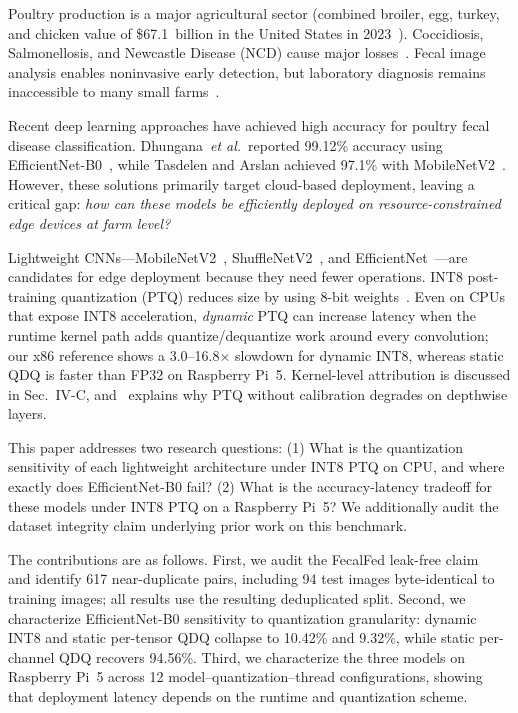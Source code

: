 \documentclass[conference,a4paper]{IEEEtran}
\begin{document}
Poultry production is a major agricultural sector (combined broiler, egg, turkey, and chicken value of \$67.1~billion in the United States in 2023~\cite{usda2024}). Coccidiosis, Salmonellosis, and Newcastle Disease (NCD) cause major losses~\cite{machuve2022}. Fecal image analysis enables noninvasive early detection, but laboratory diagnosis remains inaccessible to many small farms~\cite{tasdelen2025}.

Recent deep learning approaches have achieved high accuracy for poultry fecal disease classification. Dhungana~\textit{et al.}~reported 99.12\% accuracy using EfficientNet-B0~\cite{dhungana2025}, while Tasdelen and Arslan achieved 97.1\% with MobileNetV2~\cite{tasdelen2025}. However, these solutions primarily target cloud-based deployment, leaving a critical gap: \textit{how can these models be efficiently deployed on resource-constrained edge devices at farm level?}

Lightweight CNNs---MobileNetV2~\cite{mobilenetv2}, ShuffleNetV2~\cite{shufflenetv2}, and EfficientNet~\cite{efficientnet}---are candidates for edge deployment because they need fewer operations. INT8 post-training quantization (PTQ) reduces size by using 8-bit weights~\cite{jacob2018}. Even on CPUs that expose INT8 acceleration, \emph{dynamic} PTQ can increase latency when the runtime kernel path adds quantize/dequantize work around every convolution; our x86 reference shows a 3.0--16.8$\times$ slowdown for dynamic INT8, whereas static QDQ is faster than FP32 on Raspberry Pi~5. Kernel-level attribution is discussed in Sec.~IV-C, and~\cite{nagel2021} explains why PTQ without calibration degrades on depthwise layers.

This paper addresses two research questions: (1) What is the quantization sensitivity of each lightweight architecture under INT8 PTQ on CPU, and where exactly does EfficientNet-B0 fail? (2) What is the accuracy-latency tradeoff for these models under INT8 PTQ on a Raspberry Pi~5? We additionally audit the dataset integrity claim underlying prior work on this benchmark.

The contributions are as follows. First, we audit the FecalFed leak-free claim~\cite{chi2026} and identify 617 near-duplicate pairs, including 94 test images byte-identical to training images; all results use the resulting deduplicated split. Second, we characterize EfficientNet-B0 sensitivity to quantization granularity: dynamic INT8 and static per-tensor QDQ collapse to 10.42\% and 9.32\%, while static per-channel QDQ recovers 94.56\%. Third, we characterize the three models on Raspberry Pi~5 across 12 model--quantization--thread configurations, showing that deployment latency depends on the runtime and quantization scheme.
\end{document}
